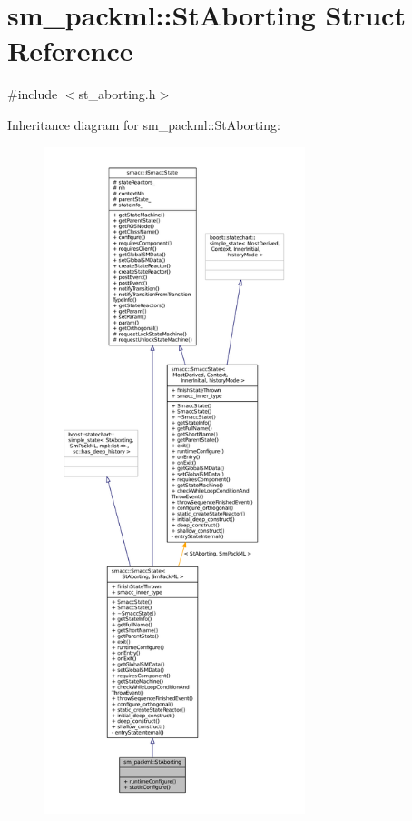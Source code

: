\hypertarget{structsm__packml_1_1StAborting}{}\section{sm\+\_\+packml\+:\+:St\+Aborting Struct Reference}
\label{structsm__packml_1_1StAborting}


{\ttfamily \#include $<$st\+\_\+aborting.\+h$>$}



Inheritance diagram for sm\+\_\+packml\+:\+:St\+Aborting\+:
\nopagebreak
\begin{figure}[H]
\begin{center}
\leavevmode
\includegraphics[height=550pt]{structsm__packml_1_1StAborting__inherit__graph}
\end{center}
\end{figure}


